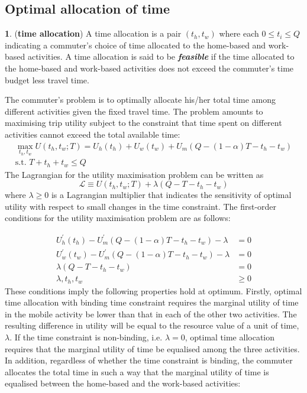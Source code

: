 \documentclass[12pt,a4paper,british]{article}
\theoremstyle{definition}
\newtheorem{defn}{\protect\definitionname}
\theoremstyle{plain}
\theoremstyle{plain}
\providecommand{\definitionname}{Definition}
\begin{document}
\subsection{Optimal allocation of time}
\begin{defn}
(\textbf{time allocation}) A time allocation is a pair $\left(t_{h},t_{w}\right)$
where each $0\leq t_{i}\leq Q$ indicating a commuter's choice of
time allocated to the home-based and work-based activities. A time
allocation is said to be \textbf{\textit{feasible}} if the time allocated
to the home-based and work-based activities does not exceed the commuter's
time budget less travel time.
\end{defn}
The commuter's problem is to optimally allocate his/her total time
among different activities given the fixed travel time. The problem
amounts to maximising trip utility subject to the constraint that
time spent on different activities cannot exceed the total available
time:
\begin{gather*}
\max_{t_{h},t_{w}}U\left(t_{h},t_{w};T\right)=U_{h}\left(t_{h}\right)+U_{w}\left(t_{w}\right)+U_{m}\left(Q-\left(1-\alpha\right)T-t_{h}-t_{w}\right)\\
\mbox{s.t. }T+t_{h}+t_{w}\leq Q
\end{gather*}
 The Lagrangian for the utility maximisation problem can be written
as
\[
\mathcal{L}\equiv U\left(t_{h},t_{w};T\right)+\lambda\left(Q-T-t_{h}-t_{w}\right)
\]
where $\lambda\geq0$ is a Lagrangian multiplier that indicates the
sensitivity of optimal utility with respect to small changes in the
time constraint. The first-order conditions for the utility maximisation
problem are as follows:

\begin{equation}
\begin{aligned}U_{h}^{\prime}\left(t_{h}\right)-U_{m}^{\prime}\left(Q-\left(1-\alpha\right)T-t_{h}-t_{w}\right)-\lambda & =0\\
U_{w}^{\prime}\left(t_{w}\right)-U_{m}^{\prime}\left(Q-\left(1-\alpha\right)T-t_{h}-t_{w}\right)-\lambda & =0\\
\lambda\left(Q-T-t_{h}-t_{w}\right) & =0\\
\lambda,t_{h},t_{w} & \geq0
\end{aligned}
\label{eq:foc_deterministic}
\end{equation}
These conditions imply the following properties hold at optimum. Firstly,
optimal time allocation with binding time constraint requires the
marginal utility of time in the mobile activity be lower than that
in each of the other two activities. The resulting difference in utility
will be equal to the resource value of a unit of time, $\lambda$.
If the time constraint is non-binding, i.e. $\lambda=0$, optimal
time allocation requires that the marginal utility of time be equalised
among the three activities. In addition, regardless of whether the
time constraint is binding, the commuter allocates the total time
in such a way that the marginal utility of time is equalised between
the home-based and the work-based activities:
\end{document}
